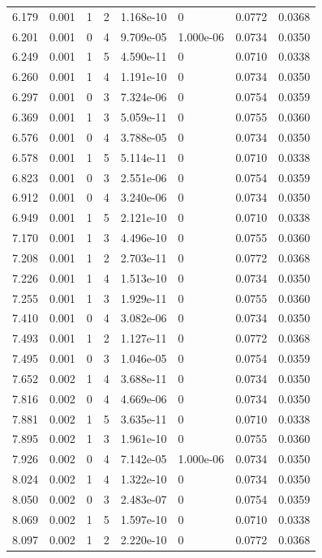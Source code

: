 \documentclass[preview]{standalone}
\begin{document}
{{{\begin{tabular}{L{1.2cm}C{1.2cm} C{0.3cm}C{0.5cm} C{1.4cm}C{1.4cm} C{1.4cm}C{1.4cm}}
  6.179  &  0.001  & 1     &  2 &  1.168e-10  & 0  & 0.0772 &  0.0368   \\ 
  6.201  &  0.001  & 0     &  4 &  9.709e-05  & 1.000e-06  & 0.0734 &  0.0350   \\ 
  6.249  &  0.001  & 1     &  5 &  4.590e-11  & 0  & 0.0710 &  0.0338   \\ 
  6.260  &  0.001  & 1     &  4 &  1.191e-10  & 0  & 0.0734 &  0.0350   \\ 
  6.297  &  0.001  & 0     &  3 &  7.324e-06  & 0  & 0.0754 &  0.0359   \\ 
  6.369  &  0.001  & 1     &  3 &  5.059e-11  & 0  & 0.0755 &  0.0360   \\ 
  6.576  &  0.001  & 0     &  4 &  3.788e-05  & 0  & 0.0734 &  0.0350   \\ 
  6.578  &  0.001  & 1     &  5 &  5.114e-11  & 0  & 0.0710 &  0.0338   \\ 
  6.823  &  0.001  & 0     &  3 &  2.551e-06  & 0  & 0.0754 &  0.0359   \\ 
  6.912  &  0.001  & 0     &  4 &  3.240e-06  & 0  & 0.0734 &  0.0350   \\ 
  6.949  &  0.001  & 1     &  5 &  2.121e-10  & 0  & 0.0710 &  0.0338   \\ 
  7.170  &  0.001  & 1     &  3 &  4.496e-10  & 0  & 0.0755 &  0.0360   \\ 
  7.208  &  0.001  & 1     &  2 &  2.703e-11  & 0  & 0.0772 &  0.0368   \\ 
  7.226  &  0.001  & 1     &  4 &  1.513e-10  & 0  & 0.0734 &  0.0350   \\ 
  7.255  &  0.001  & 1     &  3 &  1.929e-11  & 0  & 0.0755 &  0.0360   \\ 
  7.410  &  0.001  & 0     &  4 &  3.082e-06  & 0  & 0.0734 &  0.0350   \\ 
  7.493  &  0.001  & 1     &  2 &  1.127e-11  & 0  & 0.0772 &  0.0368   \\ 
  7.495  &  0.001  & 0     &  3 &  1.046e-05  & 0  & 0.0754 &  0.0359   \\ 
  7.652  &  0.002  & 1     &  4 &  3.688e-11  & 0  & 0.0734 &  0.0350   \\ 
  7.816  &  0.002  & 0     &  4 &  4.669e-06  & 0  & 0.0734 &  0.0350   \\ 
  7.881  &  0.002  & 1     &  5 &  3.635e-11  & 0  & 0.0710 &  0.0338   \\ 
  7.895  &  0.002  & 1     &  3 &  1.961e-10  & 0  & 0.0755 &  0.0360   \\ 
  7.926  &  0.002  & 0     &  4 &  7.142e-05  & 1.000e-06  & 0.0734 &  0.0350   \\ 
  8.024  &  0.002  & 1     &  4 &  1.322e-10  & 0  & 0.0734 &  0.0350   \\ 
  8.050  &  0.002  & 0     &  3 &  2.483e-07  & 0  & 0.0754 &  0.0359   \\ 
  8.069  &  0.002  & 1     &  5 &  1.597e-10  & 0  & 0.0710 &  0.0338   \\ 
  8.097  &  0.002  & 1     &  2 &  2.220e-10  & 0  & 0.0772 &  0.0368   \\ 
\hline 
\end{tabular} 

}}}
\end{document}
